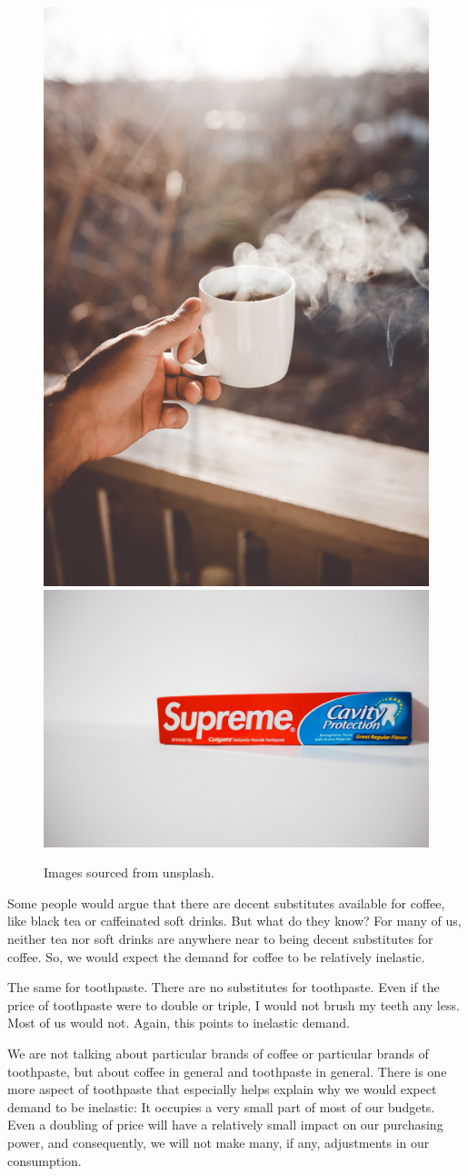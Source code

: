 \documentclass[
]{book}
\begin{document}
\begin{figure}

{\centering \includegraphics[width=0.45\linewidth]{img/demand/fig6} \includegraphics[width=0.45\linewidth]{img/demand/fig6b} 

}

\caption{Images sourced from unsplash.}\label{fig:demand06}
\end{figure}

Some people would argue that there are decent substitutes available for coffee, like black tea or caffeinated soft drinks. But what do they know? For many of us, neither tea nor soft drinks are anywhere near to being decent substitutes for coffee. So, we would expect the demand for coffee to be relatively inelastic.

The same for toothpaste. There are no substitutes for toothpaste. Even if the price of toothpaste were to double or triple, I would not brush my teeth any less. Most of us would not. Again, this points to inelastic demand.

We are not talking about particular brands of coffee or particular brands of toothpaste, but about coffee in general and toothpaste in general. There is one more aspect of toothpaste that especially helps explain why we would expect demand to be inelastic: It occupies a very small part of most of our budgets. Even a doubling of price will have a relatively small impact on our purchasing power, and consequently, we will not make many, if any, adjustments in our consumption.
\end{document}
